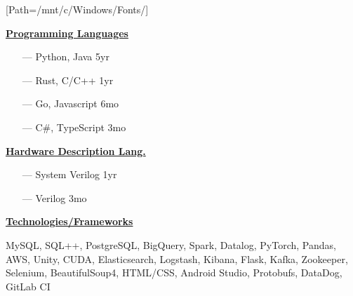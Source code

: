 \documentclass{WeiAndrew}
\begin{document}
[Path=/mnt/c/Windows/Fonts/]
\setlength{\topskip}{0pt}
\noindent{}%
{%
    \hspace{0.02\textwidth}
    \begin{minipage}[t][\textheight-2\fboxsep-2\fboxrule][t]{0.25\textwidth}
        \color{white}
        \vspace{12px}
        \vspace{12px}
        \vspace{12px}

        \begin{itemize}[align=center, leftmargin=7.5mm]
        \end{itemize}
        \vspace{12px}

        \textbf{\underline{Programming Languages}}
        \begin{itemize}[leftmargin=4mm, rightmargin=20px]
            \item[---] Python, Java    \hfill 5yr
            \item[---] Rust, C/C++     \hfill 1yr
            \item[---] Go, Javascript  \hfill 6mo
            \item[---] C\#, TypeScript \hfill 3mo
        \end{itemize}
        \vspace{12px}

        \noindent\textbf{\underline{Hardware Description Lang.}}
        \begin{itemize}[leftmargin=4mm, rightmargin=20px]
            \item[---] System Verilog \hfill 1yr
            \item[---] Verilog        \hfill 3mo
        \end{itemize}
        \vspace{12px}

        \textbf{\underline{Technologies/Frameworks}}
        \raggedright MySQL, SQL++, PostgreSQL, BigQuery,
        Spark, Datalog, PyTorch,
        Pandas, AWS, Unity, CUDA,
        Elasticsearch, Logstash,
        Kibana, Flask, Kafka,
        Zookeeper, Selenium,
        BeautifulSoup4, HTML/CSS,
        Android Studio, Protobufs,
        DataDog, GitLab CI
        \vspace{12px}


\end{minipage}}
\end{document}
